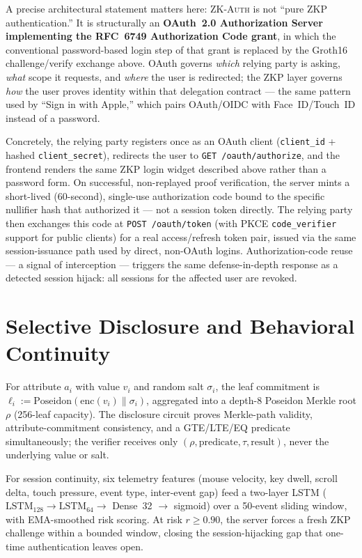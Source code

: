 \documentclass[12pt,a4paper,oneside]{report}
\begin{document}
A precise architectural statement matters here: \textsc{ZK-Auth} is not
``pure ZKP authentication.'' It is structurally an \textbf{OAuth~2.0
Authorization Server implementing the RFC~6749 Authorization Code
grant}, in which the conventional password-based login step of that
grant is replaced by the Groth16 challenge/verify exchange above. OAuth
governs \textit{which} relying party is asking, \textit{what} scope it
requests, and \textit{where} the user is redirected; the ZKP layer
governs \textit{how} the user proves identity within that delegation
contract --- the same pattern used by ``Sign in with Apple,'' which
pairs OAuth/OIDC with Face~ID/Touch~ID instead of a password.

Concretely, the relying party registers once as an OAuth client
(\texttt{client\_id} + hashed \texttt{client\_secret}), redirects the
user to \texttt{GET /oauth/authorize}, and the frontend renders the
same ZKP login widget described above rather than a password form. On
successful, non-replayed proof verification, the server mints a
short-lived (60-second), single-use authorization code bound to the
specific nullifier hash that authorized it --- not a session token
directly. The relying party then exchanges this code at
\texttt{POST /oauth/token} (with PKCE \texttt{code\_verifier} support
for public clients) for a real access/refresh token pair, issued via
the same session-issuance path used by direct, non-OAuth logins.
Authorization-code reuse --- a signal of interception --- triggers the
same defense-in-depth response as a detected session hijack: all
sessions for the affected user are revoked.

\section{Selective Disclosure and Behavioral Continuity}

For attribute $a_i$ with value $v_i$ and random salt $\sigma_i$, the leaf
commitment is $\ell_i := \text{Poseidon}(\text{enc}(v_i) \| \sigma_i)$,
aggregated into a depth-8 Poseidon Merkle root $\rho$ (256-leaf capacity).
The disclosure circuit proves Merkle-path validity, attribute-commitment
consistency, and a GTE/LTE/EQ predicate simultaneously; the verifier
receives only $(\rho, \text{predicate}, \tau, \text{result})$, never the
underlying value or salt.

For session continuity, six telemetry features (mouse velocity, key
dwell, scroll delta, touch pressure, event type, inter-event gap) feed a
two-layer LSTM ($\text{LSTM}_{128} \to \text{LSTM}_{64} \to$ Dense~32
$\to$ sigmoid) over a 50-event sliding window, with EMA-smoothed risk
scoring. At risk $r \geq 0.90$, the server forces a fresh ZKP challenge
within a bounded window, closing the session-hijacking gap that one-time
authentication leaves open.
\end{document}
